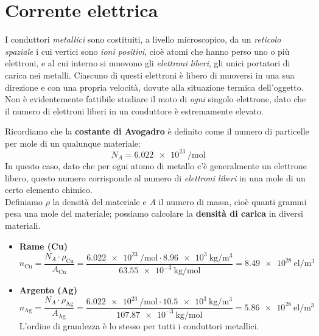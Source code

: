 \section{Corrente elettrica}
I conduttori \textit{metallici} sono costituiti, a livello microscopico, da un \textit{reticolo spaziale} i cui vertici sono \textit{ioni positivi}, cioè atomi che hanno perso uno o più elettroni, e al cui interno si muovono gli \textit{elettroni liberi}, gli unici portatori di carica nei metalli.
Ciascuno di questi elettroni è libero di muoversi in una sua direzione e con una propria velocità, dovute alla situazione termica dell'oggetto. Non è evidentemente fattibile studiare il moto di \textit{ogni} singolo elettrone, dato che il numero di elettroni liberi in un conduttore è estremamente elevato.
\begin{examplewt}
	Ricordiamo che la \textbf{costante di Avogadro} è definito come il numero di particelle per mole di un qualunque materiale:
	\begin{equation*}
		N_A=\SI[exponent-product=\ensuremath{\cdot}]{6,022e23}{\per\mole}
	\end{equation*}
	In questo caso, dato che per ogni atomo di metallo c'è generalmente un elettrone libero, questo numero corrisponde al numero di \textit{elettroni liberi} in una mole di un certo elemento chimico.\\
	Definiamo $\rho$ la densità del materiale e $A$ il numero di massa, cioè quanti grammi pesa una mole del materiale; possiamo calcolare la \textbf{densità di carica} in diversi materiali.
	\begin{itemize}
		\item \textbf{Rame (Cu)}%
		\begin{equation*}
			n_{\textrm{Cu}}=\frac{N_A\cdot\rho_{\mathrm{Cu}}}{A_{\mathrm{Cu}}}=\frac{\SI[exponent-product=\ensuremath{\cdot}]{6,022e23}{\per\mole}\cdot\SI[exponent-product=\ensuremath{\cdot}]{8,96e3}{\kilogram\per\cubic\meter}}{\SI[exponent-product=\ensuremath{\cdot}]{63,55e-3}{\kilogram\per\mole}}=\SI[per-mode = fraction,exponent-product=\ensuremath{\cdot}]{8,49e28}{\mathrm{el}\per\cubic\metre}
		\end{equation*} 
		\item \textbf{Argento (Ag)}%
		\begin{equation*}
			n_{\textrm{Ag}}=\frac{N_A\cdot\rho_{\mathrm{Ag}}}{A_{\mathrm{Ag}}}=\frac{\SI[exponent-product=\ensuremath{\cdot}]{6,022e23}{\per\mole}\cdot\SI[exponent-product=\ensuremath{\cdot}]{10,5e3}{\kilogram\per\cubic\meter}}{\SI[exponent-product=\ensuremath{\cdot}]{107,87e-3}{\kilogram\per\mole}}=\SI[per-mode = fraction,exponent-product=\ensuremath{\cdot}]{5,86e28}{\mathrm{el}\per\cubic\metre}
		\end{equation*}
	L'ordine di grandezza è lo stesso per tutti i conduttori metallici.
	\end{itemize} 
\end{examplewt}
